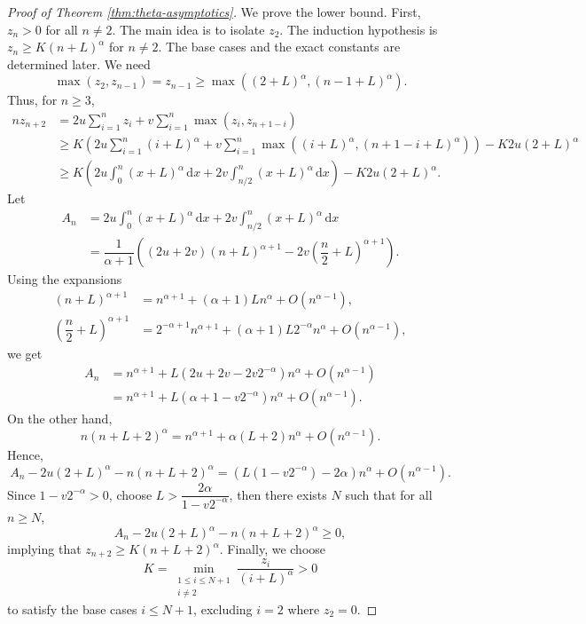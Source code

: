 \begin{proof}[Proof of Theorem \ref{thm:theta-asymptotics}]
  We prove the lower bound. First, $z_n > 0$ for all $n\ne 2$. The main idea is to isolate $z_2$. The induction hypothesis is $z_n \ge K (n+L)^\alpha$ for $n\neq 2$. The base cases and the exact constants are determined later. We need
  $$\max(z_2, z_{n-1})= z_{n-1} \ge \max((2+L)^\alpha, (n-1+L)^\alpha).$$
  Thus, for $n \ge 3$,
  \begin{align*}
    nz_{n+2}
     & = 2u\sum\limits_{i=1}^n z_i + v\sum\limits_{i=1}^n \max(z_i, z_{n+1-i})                                                                \\
     & \ge K\left(2u\sum\limits_{i=1}^{n} (i+L)^\alpha + v\sum\limits_{i=1}^{n} \max((i+L)^\alpha, (n+1-i+L)^\alpha)\right) - K2u(2+L)^\alpha \\
     & \ge K\left(2u\int_0^{n} (x+L)^\alpha \, \mathrm{d}x + 2v\int_{n/2}^{n} (x+L)^\alpha \, \mathrm{d}x\right) - K2u(2+L)^\alpha.
  \end{align*}
  Let
  \begin{align*}
    A_n
     & = 2u\int_0^{n} (x+L)^\alpha \, \mathrm{d}x + 2v\int_{n/2}^{n} (x+L)^\alpha \, \mathrm{d}x             \\
     & = \dfrac{1}{\alpha+1}\left((2u+2v)(n+L)^{\alpha+1} - 2v\left(\dfrac{n}{2}+L\right)^{\alpha+1}\right).
  \end{align*}
  Using the expansions
  \begin{align*}
    (n+L)^{\alpha+1}                       & = n^{\alpha+1} + (\alpha+1)L n^\alpha + O(n^{\alpha-1}),                         \\
    \left(\dfrac{n}{2}+L\right)^{\alpha+1} & = 2^{-\alpha+1}n^{\alpha+1} + (\alpha+1)L2^{-\alpha} n^\alpha + O(n^{\alpha-1}),
  \end{align*}
  we get
  \begin{align*}
    A_n
     & = n^{\alpha+1} + L(2u+2v-2v2^{-\alpha})n^\alpha + O(n^{\alpha-1})        \\
     & = n^{\alpha+1} + L(\alpha + 1 - v2^{-\alpha})n^\alpha + O(n^{\alpha-1}).
  \end{align*}
  On the other hand,
  $$n(n+L+2)^\alpha = n^{\alpha+1} + \alpha(L+2) n^\alpha + O(n^{\alpha-1}).$$
  Hence,
  $$A_n - 2u(2+L)^\alpha - n(n+L+2)^\alpha = (L(1-v2^{-\alpha}) - 2\alpha) n^\alpha + O(n^{\alpha-1}).$$
  Since $1-v2^{-\alpha} > 0$, choose $L>\dfrac{2\alpha}{1-v2^{-\alpha}}$, then there exists $N$ such that for all $n \ge N$,
  $$A_n - 2u(2+L)^\alpha - n(n+L+2)^\alpha \ge 0,$$
  implying that $z_{n+2} \ge K(n+L+2)^\alpha$. Finally, we choose
  $$K = \min\limits_{\substack{1\le i\le N+1 \\ i\ne 2}}\dfrac{z_i}{(i+L)^\alpha} > 0$$
  to satisfy the base cases $i\le N+1$, excluding $i=2$ where $z_2=0$. 


\end{proof}
